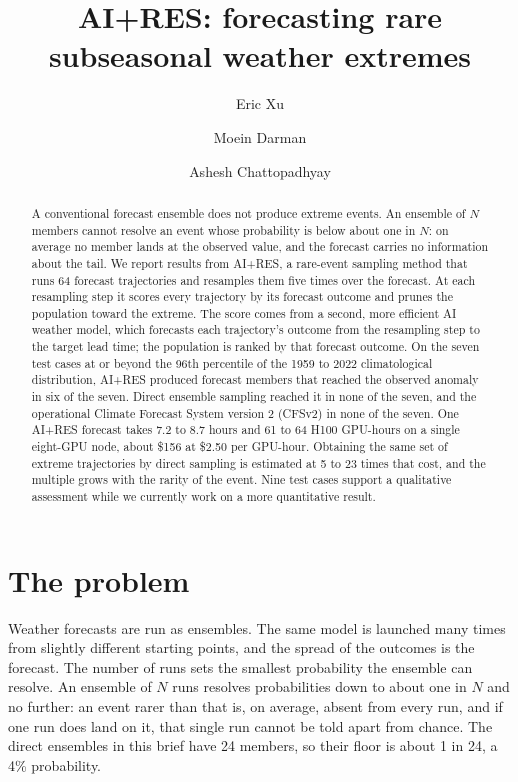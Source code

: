 \documentclass[11pt]{article}
\title{\vspace{-1.4cm}\large AI+RES: forecasting rare subseasonal weather extremes}
\author{\normalsize Eric Xu \and \normalsize Moein Darman \and \normalsize Ashesh Chattopadhyay}
\date{\vspace{-2.2em}}
\begin{document}
\maketitle
\vspace{-0.5cm}

\begin{abstract}
\noindent
A conventional forecast ensemble does not produce extreme events. An ensemble of $N$ members
cannot resolve an event whose probability is below about one in $N$: on average no member lands at
the observed value, and the forecast carries no information about the tail. We report results from AI+RES, a rare-event sampling method that
runs 64 forecast trajectories and resamples them five times over the forecast. At each
resampling step it scores every trajectory by its forecast outcome and prunes the population toward
the extreme. The score comes from a second, more efficient AI weather model, which forecasts each
trajectory's outcome from the resampling step to the target lead time; the population is ranked by
that forecast outcome. On the seven test cases at or beyond the 96th percentile of the 1959 to 2022 climatological
distribution, AI+RES produced forecast members that reached the observed anomaly in six of the seven.
Direct ensemble sampling reached it in none of the seven, and the operational Climate Forecast
System version 2 (CFSv2) in none of the seven. One AI+RES forecast takes 7.2 to 8.7 hours and 61
to 64 H100 GPU-hours on a single eight-GPU node, about \$156 at \$2.50 per GPU-hour. Obtaining
the same set of extreme trajectories by direct sampling is estimated at 5 to 23 times that cost, and the multiple grows with the rarity of the event. Nine test cases support a qualitative assessment while we
currently work on a more quantitative result.
\end{abstract}

\section{The problem}
\label{sec:problem}

Weather forecasts are run as ensembles. The same model is launched many times from slightly
different starting points, and the spread of the outcomes is the forecast. The number of runs
sets the smallest probability the ensemble can resolve. An ensemble of $N$ runs resolves
probabilities down to about one in $N$ and no further: an event rarer than that is, on average,
absent from every run, and if one run does land on it, that single run cannot be told apart from
chance. The direct ensembles in this brief have 24 members, so their floor is about 1 in 24, a 4\%
probability.
\end{document}

